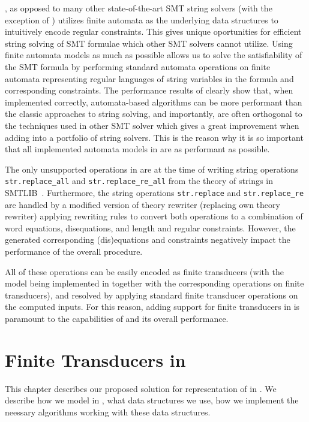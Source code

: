\noodler, as opposed to many other state-of-the-art SMT string solvers (with the exception of \ostrich) utilizes finite automata as the underlying data structures to intuitively encode regular constraints.
This gives \noodler unique oportunities for efficient string solving of SMT formulae which other SMT solvers cannot utilize.
Using finite automata models as much as possible allows us to solve the satisfiability of the SMT formula by performing standard automata operations on finite automata representing regular languages of string variables in the formula and corresponding constraints.
The performance results of \noodler clearly show that, when implemented correctly, automata-based algorithms can be more performant than the classic approaches to string solving, and importantly, are often orthogonal to the techniques used in other SMT solver which gives a great improvement when adding \noodler into a portfolio of string solvers.
This is the reason why it is so important that all implemented automata models in \mata are as performant as possible.

The only unsupported operations in \noodler are at the time of writing string operations \texttt{str.replace\_all} and \texttt{str.replace\_re\_all} from the theory of strings in SMTLIB~\cite{smtlib_theory_strings}.
Furthermore, the string operations \texttt{str.replace} and \texttt{str.replace\_re} are handled by a modified \noodler version of theory rewriter (replacing \ziii own theory rewriter) applying rewriting rules to convert both operations to a combination of word equations, disequations, and length and regular constraints.
However, the generated corresponding (dis)equations and constraints negatively impact the performance of the overall procedure.

All of these operations can be easily encoded as finite transducers (with the model being implemented in \mata together with the corresponding operations on finite transducers), and resolved by applying standard finite transducer operations on the computed inputs.
For this reason, adding support for finite transducers in \mata is paramount to the capabilities of \noodler and its overall performance.

\chapter{Finite Transducers in \mata}

This chapter describes our proposed solution for representation of \nfts in \mata. We describe how we model \nfts in \mata, what data structures we use, how we implement the neessary algorithms working with these data structures.

